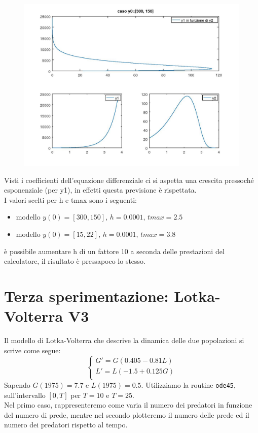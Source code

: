 \documentclass{article}
\begin{document}
	\begin{figure}[htp!]
		\centering 
		\includegraphics[width=\textwidth]{4_2_b.jpeg}
	\end{figure}
	
	Visti i coefficienti dell'equazione differenziale ci si aspetta una crescita pressoché esponenziale (per y1), in effetti questa previsione è rispettata.\\
	I valori scelti per h e tmax sono i seguenti:
	\begin{itemize}
		\item modello $y(0)=[300, 150]$, $h=0.0001$, $tmax=2.5$
		\item modello $y(0)=[15, 22]$, $h=0.0001$, $tmax=3.8$
	\end{itemize}
	è possibile aumentare h di un fattore 10 a seconda delle prestazioni del calcolatore, il risultato è pressapoco lo stesso.
	
	\section{Terza sperimentazione: Lotka-Volterra V3}
	Il modello di Lotka-Volterra che descrive la dinamica delle due popolazioni si scrive come segue:
	\begin{equation}
	\begin{cases}
	G' = G (0.405-0.81 L) \\
	L'= L (-1.5+0.125 G)\\
	\end{cases}
	\end{equation}
	Sapendo $G(1975) = 7.7$ e $L(1975) = 0.5$. Utilizziamo la routine {\tt ode45}, sull'intervallo $[0, T]$ per $T = 10$ e $T = 25$.\\
	Nel primo caso, rappresenteremo come varia il numero dei predatori in funzione del numero di prede, mentre nel secondo plotteremo il numero delle prede ed il numero dei predatori rispetto al tempo.	
\end{document}

